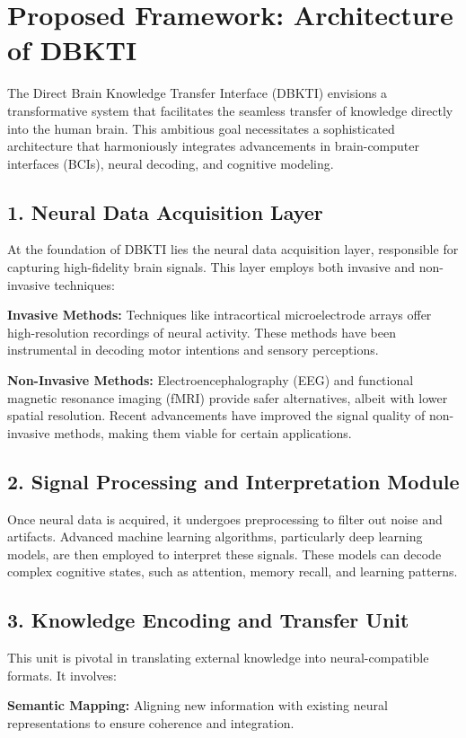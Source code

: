 \documentclass[12pt]{article}
\begin{document}
\section{Proposed Framework: Architecture of DBKTI}
The Direct Brain Knowledge Transfer Interface (DBKTI) envisions a transformative system that facilitates the seamless transfer of knowledge directly into the human brain. This ambitious goal necessitates a sophisticated architecture that harmoniously integrates advancements in brain-computer interfaces (BCIs), neural decoding, and cognitive modeling.

\subsection*{1. Neural Data Acquisition Layer}
At the foundation of DBKTI lies the neural data acquisition layer, responsible for capturing high-fidelity brain signals. This layer employs both invasive and non-invasive techniques:

\textbf{Invasive Methods:} Techniques like intracortical microelectrode arrays offer high-resolution recordings of neural activity. These methods have been instrumental in decoding motor intentions and sensory perceptions.

\textbf{Non-Invasive Methods:} Electroencephalography (EEG) and functional magnetic resonance imaging (fMRI) provide safer alternatives, albeit with lower spatial resolution. Recent advancements have improved the signal quality of non-invasive methods, making them viable for certain applications.

\subsection*{2. Signal Processing and Interpretation Module}
Once neural data is acquired, it undergoes preprocessing to filter out noise and artifacts. Advanced machine learning algorithms, particularly deep learning models, are then employed to interpret these signals. These models can decode complex cognitive states, such as attention, memory recall, and learning patterns.

\subsection*{3. Knowledge Encoding and Transfer Unit}
This unit is pivotal in translating external knowledge into neural-compatible formats. It involves:

\textbf{Semantic Mapping:} Aligning new information with existing neural representations to ensure coherence and integration.
\end{document}

